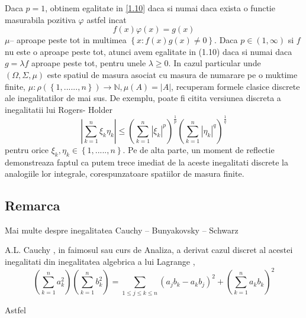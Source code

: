 \documentclass[a4paper,12pt,oneside]{report}
\begin{document}
Daca \(p = 1\), obtinem egalitate in \ref{1.10} daca si numai daca exista o functie masurabila pozitiva \(\varphi\) astfel incat 
\begin{displaymath}
  f\left ( x \right )\varphi \left ( x \right ) = g\left ( x \right )
\end{displaymath}
\(\mu –\) aproape peste tot in multimea \(\left \{ x : f\left ( x \right )g\left ( x \right )\neq 0 \right \}\). 
	Daca \(p \in \left ( 1 , \infty  \right )\) si \(f\) nu este o aproape peste tot, atunci avem egalitate in (1.10) daca si numai daca  \(g = \lambda f\) aproape peste tot, pentru unele \(\lambda \geq 0\). 
	In  cazul particular unde \(\left ( \Omega , \Sigma, \mu \right )\) este spatiul de masura asociat cu masura de numarare pe o muktime finite, \(\mu  : \rho \left ( \left \{ 1,......, n \right \} \right )\rightarrow \mathbb{N}, \mu \left ( A \right ) = \left | A \right |\), 
recuperam formele clasice discrete ale inegalitatilor de mai sus. De exemplu, poate fi citita versiunea discreta a inegalitatii lui Rogers- Holder
\begin{displaymath}
  \left | \sum_{k=1}^{n} \xi _{k}\eta _{k}\right |\leq \left ( \sum_{k = 1}^{n}\left | \xi _{k}\right |^{p}  \right )^{\frac{1}{p}}\left ( \sum_{k = 1}^{n} \left | \eta _{k} \right |^{q}\right )^{\frac{1}{q}}
\end{displaymath}
pentru  orice \(\xi _{k}, \eta _{k} \in \left \{ 1,.....,n \right \}.\) Pe de alta parte, un moment de reflectie demonstreaza faptul ca putem trece imediat de la aceste inegalitati discrete la analogiile lor integrale, corespunzatoare spatiilor de masura finite. 

\subsection{Remarca}

Mai multe despre inegalitatea Cauchy – Bunyakovsky – Schwarz

A.L. Cauchy , in faimosul sau curs de Analiza, a derivat cazul discret al acestei inegalitati din inegalitatea algebrica a  lui Lagrange ,
\begin{displaymath}
  \left ( \sum_{k = 1}^{n} a_{k}^{2}\right )\left ( \sum_{k = 1}^{n} b_{k}^{2}\right ) =  \sum_{1\leq j\leq k\leq n}\left ( a_{j}b_{k} - a_{k}b_{j} \right )^{2} + \left ( \sum_{k = 1}^{n} a_{k}b_{k}\right )^{2}
\end{displaymath}

Astfel 
\end{document}
